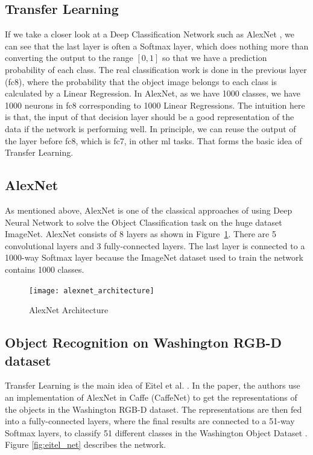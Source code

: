 \subsection{Transfer Learning}
If we take a closer look at a Deep Classification Network such as AlexNet \cite{alexnet}, we can see that the last layer is often a Softmax layer, which does nothing more
than converting the output to the range $[0, 1]$ so that we have a prediction probability
of each class. The real classification work is done in the previous layer (fc8), where the
probability that the object image belongs to each class is calculated by a Linear
Regression. In AlexNet, as we have 1000 classes, we have 1000 neurons in fc8 corresponding
to 1000 Linear Regressions. The intuition here is that, the input of that decision layer
should be a good representation of the data if the network is performing well. In
principle, we can reuse the output of the layer before fc8, which is fc7, in other
\acrshort{ml} tasks. That forms the basic idea of Transfer Learning.

\subsection{AlexNet}
As mentioned above, AlexNet is one of the classical approaches of using Deep Neural
Network to solve the Object Classification task on the huge dataset ImageNet.  AlexNet
consists of 8 layers as shown in Figure~\ref{fig:alexnet}. There are 5 convolutional
layers and 3 fully-connected layers. The last layer is connected to a 1000-way Softmax
layer because the ImageNet dataset \cite{imagenet} used to train the network contains
1000 classes.

\begin{figure}[htb]
  \centering
  \texttt{[image: alexnet\_architecture]}
  \caption{AlexNet Architecture}\label{fig:alexnet}
\end{figure}

\subsection{Object Recognition on Washington RGB-D dataset \cite{eitel}}
Transfer Learning is the main idea of Eitel et al. \cite{eitel}. In the paper, the
authors use an implementation of AlexNet in Caffe (CaffeNet) to get the representations of
the objects in the Washington RGB-D dataset. The representations are then fed into a
fully-connected layers, where the final results are connected to a 51-way Softmax layers, to
classify 51 different classes in the Washington Object Dataset \cite{washington_rgbd}.
Figure \ref{fig:eitel_net} describes the network.

